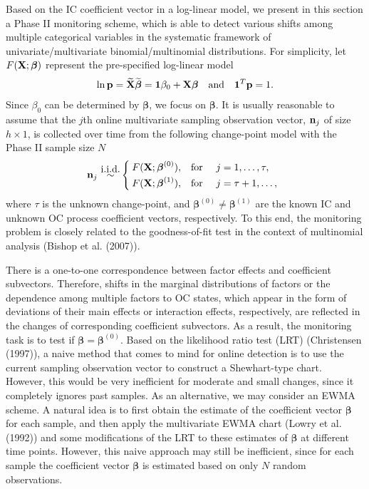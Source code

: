 Based on the IC coefficient vector in a log-linear model, we present in this section
a Phase II monitoring scheme, which is able to detect various shifts among multiple
categorical variables in the systematic framework of univariate/multivariate
binomial/multinomial distributions. For simplicity, let $F({\bf X};{\boldsymbol\beta})$
represent the pre-specified log-linear model
\begin{align}
\ln{\bf p}=\widetilde{\bf X}\widetilde{\bm\beta}=\bm 1\beta_0+{\bf
X}\bm\beta\quad\mathrm{and}\quad\bm 1^T{\bf p}=1.\label{F2.3}
\end{align}
Since $\beta_0$ can be determined by $\bm\beta$, we focus on $\bm\beta$. It is
usually reasonable to assume that the $j$th online multivariate sampling observation
vector, ${\bf n}_j$ of size $h\times 1$, is collected over time from the following
change-point model with the Phase II sample size $N$
\begin{align}
{\bf n}_j\ {\mathop{\sim}\limits^{\mbox{i.i.d.}}}\left\{\hspace{-0.1cm}
\begin{array}{ll} F({\bf X};{\bm\beta}^{(0)}), & {\mathrm {for\ }} \quad j=1,\ldots,\tau,\\[0.1cm]
F({\bf X};{\bm\beta}^{(1)}), & {\mathrm {for\ }} \quad j=\tau+1,\ldots,
\end{array}\right.\label{F2.4}
\end{align}
where $\tau$ is the unknown change-point, and $\bm\beta^{(0)} \neq \bm\beta^{(1)}$
are the known IC and unknown OC process coefficient vectors, respectively. To this
end, the monitoring problem is closely related to the goodness-of-fit test in the
context of multinomial analysis (Bishop et al. (2007)).

There is a one-to-one correspondence between factor effects and coefficient
subvectors. Therefore, shifts in the marginal distributions of factors or the
dependence among multiple factors to OC states, which appear in the form of
deviations of their main effects or interaction effects, respectively, are reflected
in the changes of corresponding coefficient subvectors. As a result, the monitoring
task is to test if $\bm\beta=\bm\beta^{(0)}$. Based on the likelihood ratio test
(LRT) (Christensen (1997)), a naive method that comes to mind for online detection
is to use the current sampling observation vector to construct a Shewhart-type
chart. However, this would be very inefficient for moderate and small changes, since
it completely ignores past samples. As an alternative, we may consider an EWMA
scheme. A natural idea is to first obtain the estimate of the coefficient vector
$\bm\beta$ for each sample, and then apply the multivariate EWMA chart (Lowry et al.
(1992)) and some modifications of the LRT to these estimates of $\bm\beta$ at
different time points. However, this naive approach may still be inefficient, since
for each sample the coefficient vector $\bm\beta$ is estimated based on only $N$
random observations.

